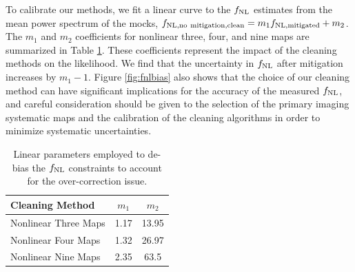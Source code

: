 To calibrate our methods, we fit a linear curve to the $f_{\rm NL}$ estimates from the mean power spectrum of the mocks, $f_{\rm NL, no~mitigation, clean} = m_{1} f_{\rm NL, mitigated} + m_{2}$. The $m_{1}$ and $m_{2}$ coefficients for nonlinear three, four, and nine maps are summarized in Table \ref{tab:debiasparams}. These coefficients represent the impact of the cleaning methods on the likelihood. We find that the uncertainty in $f_{\rm NL}$ after mitigation increases by $m_{1}-1$. Figure \ref{fig:fnlbias} also shows that the choice of our cleaning method can have significant implications for the accuracy of the measured $f_{\rm NL}$, and careful consideration should be given to the selection of the primary imaging systematic maps and the calibration of the cleaning algorithms in order to minimize systematic uncertainties.


\begin{table}
\begin{center}
\caption{Linear parameters employed to de-bias the $f_{\rm NL}$ constraints to account for the over-correction issue. %
}\label{tab:debiasparams}
\begin{tabular}{lcc}
\hline
\hline
\textbf{Cleaning Method} & $m_{1}$ & $m_{2}$ \\
\hline
Nonlinear Three Maps & 1.17 & 13.95 \\
Nonlinear Four Maps & 1.32 & 26.97 \\
Nonlinear Nine Maps & 2.35 & 63.5\\
\hline
\end{tabular}
\end{center}
\end{table}
